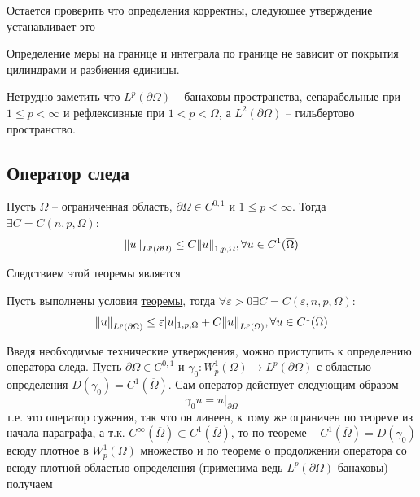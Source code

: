 \documentclass[12pt,a4paper]{article}
\begin{document}
Остается проверить что определения корректны, следующее утверждение устанавливает это
\begin{proposition}{}{}
	Определение меры на границе и интеграла по границе не зависит от покрытия цилиндрами и разбиения единицы.
\end{proposition}
Нетрудно заметить что $L^p (\partial \Omega)$ -- банаховы пространства, сепарабельные при $1 \leq p < \infty$ и рефлексивные при $1 < p < \Omega$, а $L^2 (\partial \Omega)$ -- гильбертово пространство.

\subsection{Оператор следа}

\begin{theorem}{}{}\label{mth:4}
	Пусть $\Omega$ -- ограниченная область, $\partial \Omega \in C^{0, 1}$ и $1 \leq p < \infty$.  Тогда \\ $\exists C = C(n, p, \Omega)$:
	\begin{equation*}
		\norm{u}_{L^p (\partial \Omega)} \leq C \norm{u}_{1, p, \Omega}, \forall u \in C^1 (\overline{\Omega})
	\end{equation*}
\end{theorem}
Следствием этой теоремы является
\begin{proposition}{}{}
	Пусть выполнены условия \hyperref[mth:4]{теоремы}, тогда $\forall \varepsilon > 0 \exists C = C(\varepsilon, n, p, \Omega)$:
	\begin{equation*}
		\norm{u}_{L^p (\partial \Omega)} \leq \varepsilon |u|_{1, p, \Omega} + C\norm{u}_{L^p (\Omega)}, \forall u \in C^1 (\overline{\Omega})
	\end{equation*}
\end{proposition}

Введя необходимые технические утверждения, можно приступить к определению оператора следа. Пусть $\partial \Omega \in C^{0, 1}$ и $\gamma_0: W_p^1 (\Omega) \to L^p (\partial \Omega)$ с областью определения $D(\gamma_0) = C^1 (\overline{\Omega})$. Сам оператор действует следующим образом
\begin{equation*}
	\gamma_0 u = u|_{\partial \Omega}
\end{equation*}
т.е. это оператор сужения, так что он линеен, к тому же ограничен по теореме из начала параграфа, а т.к. $C^\infty (\overline{\Omega}) \subset C^1 (\overline{\Omega})$, то по \hyperref[mth:5]{теореме} -- $C^1 (\overline{\Omega}) = D(\gamma_0)$ всюду плотное в $W_p^1 (\Omega)$ множество и по теореме о продолжении оператора со всюду-плотной областью определения (применима ведь $L^p (\partial \Omega)$ банаховы) получаем
\end{document}
